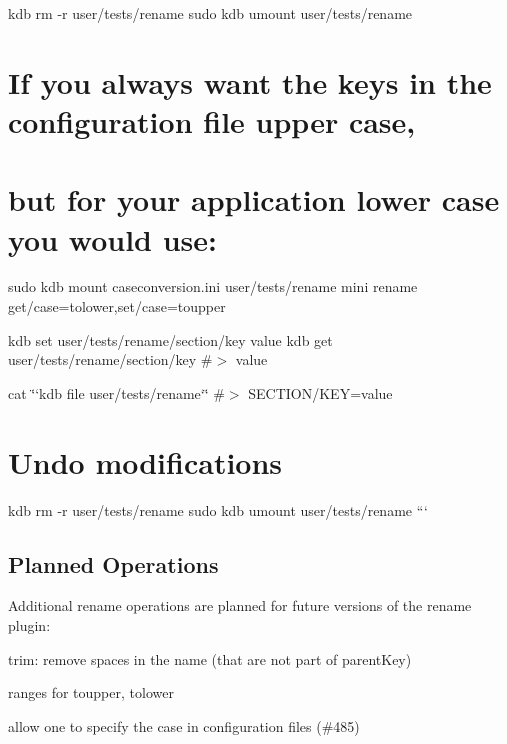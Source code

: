 kdb rm -\/r user/tests/rename sudo kdb umount user/tests/rename 
\begin{DoxyCode}
\end{DoxyCode}
 \section*{If you always want the keys in the configuration file upper case,}

\section*{but for your application lower case you would use\+:}

sudo kdb mount caseconversion.\+ini user/tests/rename mini rename get/case=tolower,set/case=toupper

kdb set user/tests/rename/section/key value kdb get user/tests/rename/section/key \#$>$ value

cat \char`\"{}`kdb file user/tests/rename`\char`\"{} \#$>$ S\+E\+C\+T\+I\+O\+N/\+K\+EY=value

\section*{Undo modifications}

kdb rm -\/r user/tests/rename sudo kdb umount user/tests/rename ```

\subsection*{Planned Operations}

Additional rename operations are planned for future versions of the rename plugin\+:


\begin{DoxyItemize}
\item trim\+: remove spaces in the name (that are not part of parent\+Key)
\item ranges for toupper, tolower
\item allow one to specify the case in configuration files (\#485) 
\end{DoxyItemize}